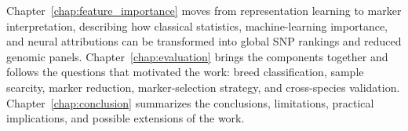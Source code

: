 Chapter~\ref{chap:feature_importance} moves from representation
learning to marker interpretation, describing how classical
statistics, machine-learning importance, and neural attributions can
be transformed into global SNP rankings and reduced genomic panels.
Chapter~\ref{chap:evaluation} brings the components together and
follows the questions that motivated the work: breed classification,
sample scarcity, marker reduction, marker-selection strategy, and
cross-species validation. Chapter~\ref{chap:conclusion} summarizes the
conclusions, limitations, practical implications, and possible
extensions of the work.


